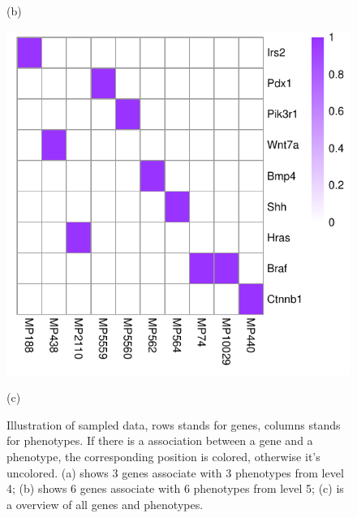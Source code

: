 \documentclass{bmcart}
\begin{document}
\begin{figure}[!h]
\begin{minipage}{.30\linewidth}
    \centerline{(b)}
  \end{minipage}
  \begin{minipage}{.4\linewidth}
   \includegraphics[width=\linewidth]{DrawPictures/v_4.pdf}
    \centerline{(c)}
  \end{minipage}
  \caption{Illustration of sampled data, rows stands for genes, columns stands for phenotypes. If there is a association between a gene and a phenotype, the corresponding position is colored, otherwise it's uncolored. (a) shows 3 genes associate with 3 phenotypes from level 4; (b) shows 6 genes associate with 6 phenotypes from level 5; (c) is a overview of all genes and phenotypes.}
  \label{fig:sampled_raw_data}
\end{figure}
\end{document}
